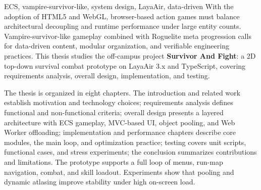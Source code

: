 \begin{enabstract}{ECS, vampire-survivor-like, system design, LayaAir, data-driven}
With the adoption of HTML5 and WebGL, browser-based action games must balance architectural decoupling and runtime performance under large entity counts. Vampire-survivor-like gameplay combined with Roguelite meta progression calls for data-driven content, modular organization, and verifiable engineering practices. This thesis studies the off-campus project \textbf{Survivor And Fight}: a 2D top-down survival combat prototype on LayaAir 3.x and TypeScript, covering requirements analysis, overall design, implementation, and testing.

The thesis is organized in eight chapters. The introduction and related work establish motivation and technology choices; requirements analysis defines functional and non-functional criteria; overall design presents a layered architecture with ECS gameplay, MVC-based UI, object pooling, and Web Worker offloading; implementation and performance chapters describe core modules, the main loop, and optimization practice; testing covers unit scripts, functional cases, and stress experiments; the conclusion summarizes contributions and limitations. The prototype supports a full loop of menus, run-map navigation, combat, and skill loadout. Experiments show that pooling and dynamic atlasing improve stability under high on-screen load.
\end{enabstract}
